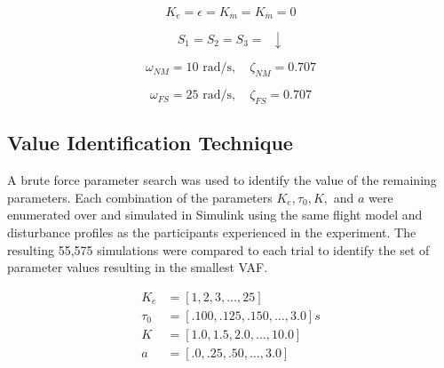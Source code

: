\begin{equation}
K_{\dot{e}} = \epsilon = K_{\dot{m}} = K_{\ddot{m}} = 0
\end{equation}

\begin{equation}
S_1 = S_2 = S_3 = \enspace \downarrow
\end{equation}

\begin{equation}
\omega_{NM} = 10 \mbox{ rad/s}, \quad \zeta_{NM} = 0.707
\end{equation}

\begin{equation}
\omega_{FS} = 25 \mbox{ rad/s}, \quad \zeta_{FS} = 0.707
\end{equation}


\subsection{Value Identification Technique}
A brute force parameter search was used to identify the value of the remaining parameters.
Each combination of the parameters $K_e, \tau_0, K,$ and $a$ were enumerated over and simulated in Simulink using the same flight model and disturbance profiles as the participants experienced in the experiment.
The resulting 55,575 simulations were compared to each trial to identify the set of parameter values resulting in the smallest VAF.

\begin{align}
    K_e &= [1, 2, 3, \ldots, 25] \\
    \tau_0 &= [.100, .125, .150, \ldots, 3.0] s \\
    K &= [1.0, 1.5, 2.0, \ldots, 10.0] \\
    a &= [.0, .25, .50, \ldots, 3.0]
\end{align}

